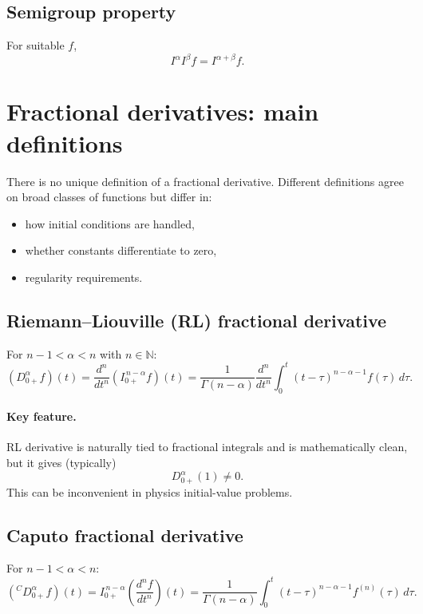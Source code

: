 \subsection{Semigroup property}
For suitable $f$,
\begin{equation}
I^\alpha I^\beta f = I^{\alpha+\beta}f.
\end{equation}


\section{Fractional derivatives: main definitions}

There is no unique definition of a fractional derivative.
Different definitions agree on broad classes of functions but differ in:
\begin{itemize}
\item how initial conditions are handled,
\item whether constants differentiate to zero,
\item regularity requirements.
\end{itemize}

\subsection{Riemann--Liouville (RL) fractional derivative}
For $n-1<\alpha<n$ with $n\in\mathbb{N}$:
\begin{equation}
\boxed{
(D_{0+}^\alpha f)(t)
=
\frac{d^n}{dt^n}\left(I_{0+}^{\,n-\alpha}f\right)(t)
=
\frac{1}{\Gamma(n-\alpha)}\frac{d^n}{dt^n}
\int_0^t (t-\tau)^{n-\alpha-1}f(\tau)\,d\tau.
}
\end{equation}

\paragraph{Key feature.}
RL derivative is naturally tied to fractional integrals and is mathematically clean,
but it gives (typically)
\begin{equation}
D_{0+}^\alpha (1)\neq 0.
\end{equation}
This can be inconvenient in physics initial-value problems.


\subsection{Caputo fractional derivative}
For $n-1<\alpha<n$:
\begin{equation}
\boxed{
({}^{C}D_{0+}^\alpha f)(t)
=
I_{0+}^{\,n-\alpha}\left(\frac{d^n f}{dt^n}\right)(t)
=
\frac{1}{\Gamma(n-\alpha)}
\int_0^t (t-\tau)^{n-\alpha-1}f^{(n)}(\tau)\,d\tau.
}
\end{equation}

